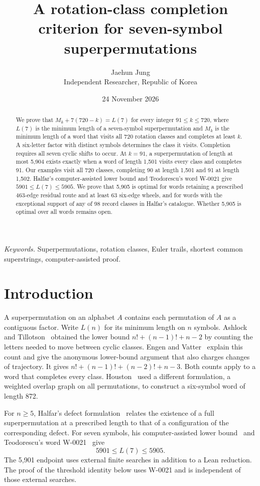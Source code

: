 \documentclass[11pt]{article}
\title{A rotation-class completion criterion for seven-symbol superpermutations}
\author{Jaehun Jung\\[4pt]{\small Independent Researcher, Republic of Korea}}
\date{24 November 2026}
\begin{document}
\maketitle
\begin{abstract}
We prove that $M_k+7(720-k)=L(7)$ for every integer $91\le k\le720$, where $L(7)$ is the minimum length of a seven-symbol superpermutation and $M_k$ is the minimum length of a word that visits all 720 rotation classes and completes at least $k$. A six-letter factor with distinct symbols determines the class it visits. Completion requires all seven cyclic shifts to occur. At $k=91$, a superpermutation of length at most 5,904 exists exactly when a word of length 1,501 visits every class and completes 91. Our examples visit all 720 classes, completing 90 at length 1,501 and 91 at length 1,502. Halfar's computer-assisted lower bound and Teodorescu's word W-0021 give $5901\le L(7)\le5905$. We prove that 5,905 is optimal for words retaining a prescribed 463-edge residual route and at least 63 six-edge wheels, and for words with the exceptional support of any of 98 record classes in Halfar's catalogue. Whether 5,905 is optimal over all words remains open.
\end{abstract}
\noindent\textit{Keywords.} Superpermutations, rotation classes, Euler trails, shortest common superstrings, computer-assisted proof.

\section{Introduction}
A superpermutation on an alphabet $A$ contains each permutation of $A$ as a contiguous factor. Write $L(n)$ for its minimum length on $n$ symbols. Ashlock and Tillotson~\cite{ashlock} obtained the lower bound $n!+(n-1)!+n-2$ by counting the letters needed to move between cyclic classes. Engen and Vatter~\cite[\S2]{engenvatter} explain this count and give the anonymous lower-bound argument that also charges changes of trajectory. It gives $n!+(n-1)!+(n-2)!+n-3$. Both counts apply to a word that completes every class. Houston~\cite{houston} used a different formulation, a weighted overlap graph on all permutations, to construct a six-symbol word of length 872.

For $n\ge5$, Halfar's defect formulation~\cite{halfardefect} relates the existence of a full superpermutation at a prescribed length to that of a configuration of the corresponding defect. For seven symbols, his computer-assisted lower bound~\cite{halfar} and Teodorescu's word W-0021~\cite{teodorescu} give
\begin{equation}
       5901\leq L(7)\leq 5905. \label{eq:sevenbounds}
\end{equation}
The 5,901 endpoint uses external finite searches in addition to a Lean reduction. The proof of the threshold identity below uses W-0021 and is independent of those external searches.
\end{document}
